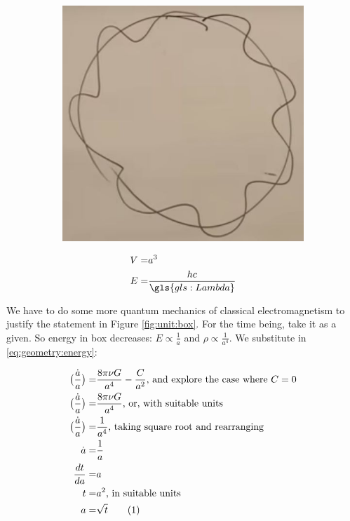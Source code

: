 \documentclass[]{article}
\newcommand\numberthis{\addtocounter{equation}{1}\tag{\theequation}}
\begin{document}
\begin{figure}[H]
\begin{center}
\begin{subfigure}[t]{0.45\textwidth}
\begin{center}
					\includegraphics[width=\textwidth]{cosmo-2-standing-waves}
				\end{center}
			\end{subfigure}	
	\end{center}
\end{figure}

\begin{align*}
	V =& a^3\\
	E =& \frac{h c}{\gls{gls:Lambda}}
\end{align*}

We have to do some more quantum mechanics of classical electromagnetism to justify the statement in Figure \ref{fig:unit:box}. For the time being, take it as a given. So energy in box decreases: $E\propto \frac{1}{a}$ and $\rho\propto \frac{1}{a^4}$. We substitute in \eqref{eq:geometry:energy}:

\begin{align*}
	\big(\frac{\dot{a}}{a}\big)  =& \frac{8\pi\nu G}{a^4} - \frac{C}{a^2} \text{, and explore the case where $C=0$}\\
	\big(\frac{\dot{a}}{a}\big)  =& \frac{8\pi\nu G}{a^4} \text{, or, with suitable units}\\
	\big(\frac{\dot{a}}{a}\big)  =& \frac{1}{a^4} \text{, taking square root and rearranging} \\
	\dot{a} =& \frac{1}{a}\\
	\frac{dt}{da} =& a\\
	t =& a^2 \text{, in suitable units}\\
	a =& \sqrt{t} \numberthis \label{eq:a:scrt:t}
\end{align*}
\end{document}

